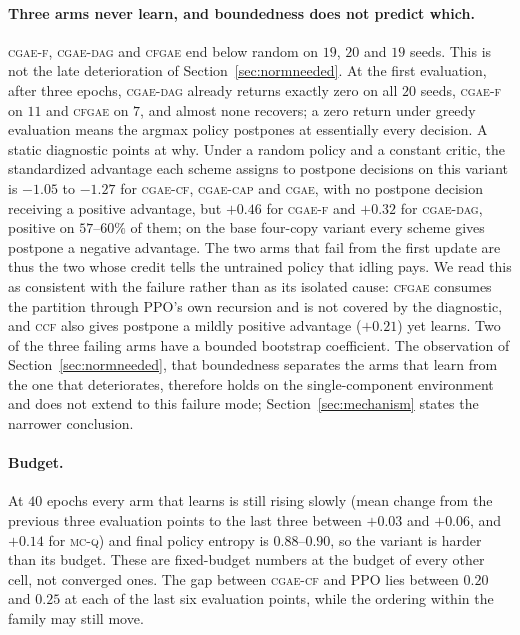 \documentclass[review,authoryear,3p,times]{elsarticle}
\newcommand{\cgae}{\textsc{cgae}}              %
\newcommand{\cflow}{\textsc{cgae-cf}}          %
\newcommand{\cflowraw}{\textsc{cgae-f}}        %
\newcommand{\cdag}{\textsc{cgae-dag}}          %
\newcommand{\ccap}{\textsc{cgae-cap}}          %
\newcommand{\ccf}{\textsc{ccf}}
\newcommand{\mcq}{\textsc{mc-q}}
\newcommand{\cfgae}{\textsc{cfgae}}
\begin{document}
\paragraph{Three arms never learn, and boundedness does not predict which.}
\cflowraw, \cdag{} and \cfgae{} end below random on $19$, $20$ and $19$ seeds.
This is not the late deterioration of Section~\ref{sec:normneeded}. At the
first evaluation, after three epochs, \cdag{} already returns exactly zero on
all $20$ seeds, \cflowraw{} on $11$ and \cfgae{} on $7$, and almost none
recovers; a zero return under greedy evaluation means the argmax policy
postpones at essentially every decision. A static diagnostic points at why.
Under a random policy and a constant critic, the standardized advantage each
scheme assigns to postpone decisions on this variant is $-1.05$ to $-1.27$ for
\cflow, \ccap{} and \cgae, with no postpone decision receiving a positive
advantage, but $+0.46$ for \cflowraw{} and $+0.32$ for \cdag, positive on
$57$--$60\%$ of them; on the base four-copy variant every scheme gives postpone
a negative advantage. The two arms that fail from the first update are thus the
two whose credit tells the untrained policy that idling pays. We read this as
consistent with the failure rather than as its isolated cause: \cfgae{}
consumes the partition through PPO's own recursion and is not covered by the
diagnostic, and \ccf{} also gives postpone a mildly positive advantage
($+0.21$) yet learns. Two of the three failing arms have a bounded bootstrap
coefficient. The observation of Section~\ref{sec:normneeded}, that boundedness
separates the arms that learn from the one that deteriorates, therefore holds
on the single-component environment and does not extend to this failure mode;
Section~\ref{sec:mechanism} states the narrower conclusion.

\paragraph{Budget.} At $40$ epochs every arm that learns is still rising
slowly (mean change from the previous three evaluation points to the last
three between $+0.03$ and $+0.06$, and $+0.14$ for \mcq) and final policy
entropy is $0.88$--$0.90$, so the variant is harder than its budget. These are
fixed-budget numbers at the budget of every other cell, not converged ones.
The gap between \cflow{} and PPO lies between $0.20$ and $0.25$ at each of the
last six evaluation points, while the ordering within the family may still
move.
\end{document}
